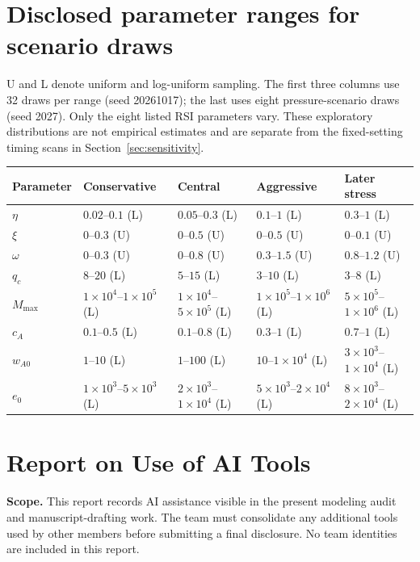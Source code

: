 \documentclass[12pt,a4paper]{article}
\theoremstyle{remark}
\begin{document}
\appendix
\noindent\begin{minipage}{\linewidth}
\section{Disclosed parameter ranges for scenario draws}\label{app:ranges}
U and L denote uniform and log-uniform sampling. The first three columns use 32 draws per range (seed 20261017); the last uses eight pressure-scenario draws (seed 2027). Only the eight listed RSI parameters vary. These exploratory distributions are not empirical estimates and are separate from the fixed-setting timing scans in Section~\ref{sec:sensitivity}.

\begingroup
\centering\footnotesize
{}\label{tab:ranges}
\begin{tabular}{@{}lllll@{}}\toprule
Parameter & Conservative & Central & Aggressive & Later stress\\\midrule
$\eta$ & $0.02$--$0.1$ (L) & $0.05$--$0.3$ (L) & $0.1$--$1$ (L) & $0.3$--$1$ (L)\\
$\xi$ & $0$--$0.3$ (U) & $0$--$0.5$ (U) & $0$--$0.5$ (U) & $0$--$0.1$ (U)\\
$\omega$ & $0$--$0.3$ (U) & $0$--$0.8$ (U) & $0.3$--$1.5$ (U) & $0.8$--$1.2$ (U)\\
$q_c$ & $8$--$20$ (L) & $5$--$15$ (L) & $3$--$10$ (L) & $3$--$8$ (L)\\
$M_{\max}$ & $1\!\times\!10^{4}$--$1\!\times\!10^{5}$ (L) & $1\!\times\!10^{4}$--$5\!\times\!10^{5}$ (L) & $1\!\times\!10^{5}$--$1\!\times\!10^{6}$ (L) & $5\!\times\!10^{5}$--$1\!\times\!10^{6}$ (L)\\
$c_A$ & $0.1$--$0.5$ (L) & $0.1$--$0.8$ (L) & $0.3$--$1$ (L) & $0.7$--$1$ (L)\\
$w_{A0}$ & $1$--$10$ (L) & $1$--$100$ (L) & $10$--$1\!\times\!10^{4}$ (L) & $3\!\times\!10^{3}$--$1\!\times\!10^{4}$ (L)\\
$e_0$ & $1\!\times\!10^{3}$--$5\!\times\!10^{3}$ (L) & $2\!\times\!10^{3}$--$1\!\times\!10^{4}$ (L) & $5\!\times\!10^{3}$--$2\!\times\!10^{4}$ (L) & $8\!\times\!10^{3}$--$2\!\times\!10^{4}$ (L)\\
\bottomrule\end{tabular}

\par
\endgroup
\end{minipage}

\clearpage
\section*{Report on Use of AI Tools}
\textbf{Scope.} This report records AI assistance visible in the present modeling audit and manuscript-drafting work. The team must consolidate any additional tools used by other members before submitting a final disclosure. No team identities are included in this report.
\end{document}
